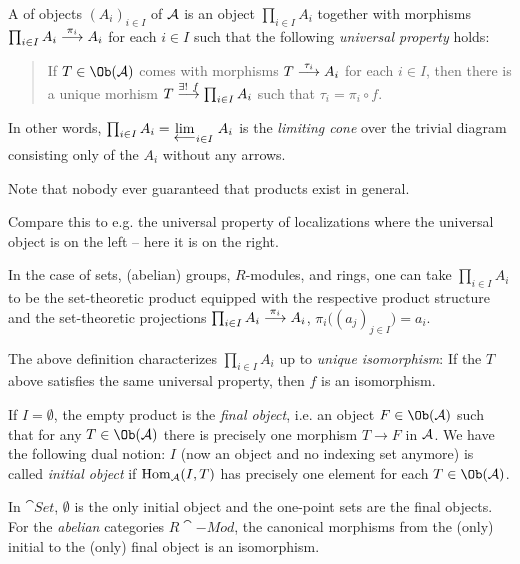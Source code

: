 \documentclass[a4paper,parskip=half,numbers=enddot, DIV=12]{scrreprt}
\begin{document}
  \begin{defi}[products]
  	A  of objects $(A_i)_{i\in I}$ of $\mathcal{A}$ is an object $\prod_{i\in I}A_i$ together with morphisms $\prod_{i\in I}A_i\morphism[\pi_i]A_i$ for each $i\in I$ such that the following \emph{universal property} holds:
  	\begin{quote}
  		If $T\in\Ob(\Aa)$ comes with morphisms $T\morphism[\tau_i]A_i$ for each $i\in I$, then there is a unique morhism $T\morphism[\exists!\ f]\prod_{i\in I}A_i$ such that $\tau_i=\pi_i\circ f$.
  	\end{quote}
  	In other words, $\prod_{i\in I}A_i=\limit[i\in I]{A_i}$ is the \emph{limiting cone} over the trivial diagram consisting only of the $A_i$ without any arrows.
  \end{defi}
  Note that nobody ever guaranteed that products exist in general.
  \begin{rem*}
  	\begin{alphanumerate}
  		\item Compare this to e.g. the universal property of localizations where the universal object is on the left -- here it is on the right.
  		\item In the case of sets, (abelian) groups, $R$-modules, and rings, one can take $\prod_{i\in I}A_i$ to be the set-theoretic product equipped with the respective product structure and the set-theoretic projections $\prod_{i\in I}A_i\morphism[\pi_i]A_i$, $\pi_i\big((a_j)_{j\in I}\big)=a_i$.
  		\item The above definition characterizes $\prod_{i\in I}A_i$ up to \emph{unique isomorphism}: If the $T$ above satisfies the same universal property, then $f$ is an isomorphism.
  		\item If $I=\emptyset$, the empty product is the \emph{final object}, i.e. an object $F\in\Ob(\Aa)$ such that for any $T\in\Ob(\Aa)$ there is precisely one morphism $T\to F$ in $\mathcal{A}$. We have the following dual notion: $I$ (now an object and no indexing set anymore) is called \emph{initial object} if $\operatorname{Hom}_{\mathcal{A}}(I,T)$ has precisely one element for each $T\in\Ob(\Aa)$.
  	\end{alphanumerate}
  \end{rem*}
  \begin{rem*}
  	In $\cat{Set}$, $\emptyset$ is the only initial object and the one-point sets are the final objects. For the \emph{abelian} categories $R\cat{-Mod}$, the canonical morphisms from the (only) initial to the (only) final object is an isomorphism.
  \end{rem*}
\end{document}
